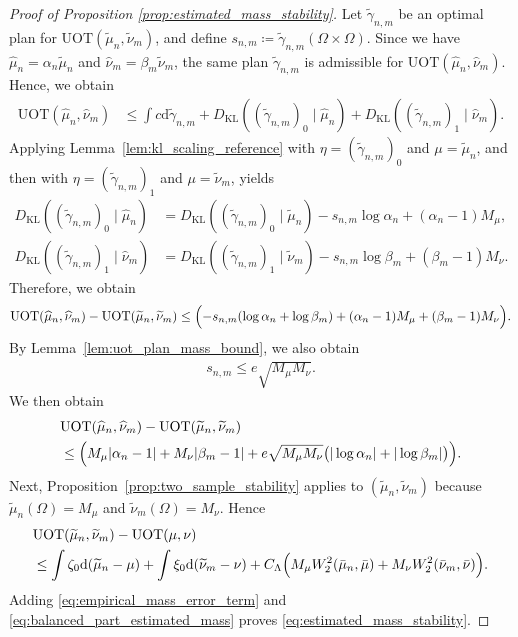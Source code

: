 \documentclass[11pt,reqno]{amsart}
\theoremstyle{definition}
\newcommand{\KL}{\mathrm{KL}}
\renewcommand{\d}{\mathrm{d}}
\renewcommand{\hat}{\widehat}
\renewcommand{\tilde}{\widetilde}
\begin{document}
\begin{proof}[Proof of Proposition \ref{prop:estimated_mass_stability}]
Let $\tilde\gamma_{n,m}$ be an optimal plan for $\mathrm{UOT}(\tilde\mu_n,\tilde\nu_m)$, and define 
    $s_{n,m} \coloneqq \tilde\gamma_{n,m}(\Omega\times\Omega)$.
Since we have $\hat\mu_n = \alpha_n\tilde\mu_n$ and $\hat\nu_m = \beta_m\tilde\nu_m$, the same plan $\tilde\gamma_{n,m}$ is admissible for $\mathrm{UOT}(\hat\mu_n,\hat\nu_m)$. Hence, we obtain
\begin{align*}
    \mathrm{UOT}(\hat\mu_n,\hat\nu_m)
    &\le \int c \d\tilde\gamma_{n,m}
    + {D_\KL}((\tilde\gamma_{n,m})_0\mid \hat\mu_n)
    + {D_\KL}((\tilde\gamma_{n,m})_1\mid \hat\nu_m).
\end{align*}
Applying Lemma~\ref{lem:kl_scaling_reference} with $\eta=(\tilde\gamma_{n,m})_0$ and $\mu=\tilde\mu_n$, and then with $\eta=(\tilde\gamma_{n,m})_1$ and $\mu=\tilde\nu_m$, yields
\begin{align*}
    {D_\KL}((\tilde\gamma_{n,m})_0\mid \hat\mu_n)
    &= {D_\KL}((\tilde\gamma_{n,m})_0\mid \tilde\mu_n) - s_{n,m}\log \alpha_n + (\alpha_n-1)M_\mu, \\
    {D_\KL}((\tilde\gamma_{n,m})_1\mid \hat\nu_m)
    &= {D_\KL}((\tilde\gamma_{n,m})_1\mid \tilde\nu_m) - s_{n,m}\log \beta_m + (\beta_m-1)M_\nu.
\end{align*}
Therefore, we obtain
\begin{align}
\begin{aligned}
    \mathrm{UOT}(\hat\mu_n,\hat\nu_m) - \mathrm{UOT}(\tilde\mu_n,\tilde\nu_m)
    \le \Bigl( -s_{n,m}(\log \alpha_n + \log \beta_m) + (\alpha_n-1)M_\mu + (\beta_m-1)M_\nu \Bigr).
\end{aligned}
\end{align}
By Lemma~\ref{lem:uot_plan_mass_bound}, we also obtain
\begin{align}
    s_{n,m} \le e\sqrt{M_\mu M_\nu}.
\end{align}
We then obtain
\begin{align}
\label{eq:empirical_mass_error_term}
\begin{aligned}
    &\mathrm{UOT}(\hat\mu_n,\hat\nu_m) - \mathrm{UOT}(\tilde\mu_n,\tilde\nu_m) \\
    &\le \Bigl( M_\mu|\alpha_n-1| + M_\nu|\beta_m-1| + e\sqrt{M_\mu M_\nu}\bigl(|\log \alpha_n| + |\log \beta_m|\bigr) \Bigr).
\end{aligned}
\end{align}
Next, Proposition~\ref{prop:two_sample_stability} applies to $(\tilde\mu_n,\tilde\nu_m)$ because $\tilde\mu_n(\Omega)=M_\mu$ and $\tilde\nu_m(\Omega)=M_\nu$. Hence
\begin{align}
\label{eq:balanced_part_estimated_mass}
\begin{aligned}
    &\mathrm{UOT}(\tilde\mu_n,\tilde\nu_m) - \mathrm{UOT}(\mu,\nu) \\
    &\le \int \zeta_0  \d(\tilde\mu_n-\mu) + \int \xi_0  \d(\tilde\nu_m-\nu)  + C_\Lambda\Bigl( M_\mu W_2^2(\bar\mu_n,\bar\mu) + M_\nu W_2^2(\bar\nu_m,\bar\nu) \Bigr).
\end{aligned}
\end{align}
Adding \eqref{eq:empirical_mass_error_term} and \eqref{eq:balanced_part_estimated_mass} proves  \eqref{eq:estimated_mass_stability}.


\end{proof}
\end{document}
